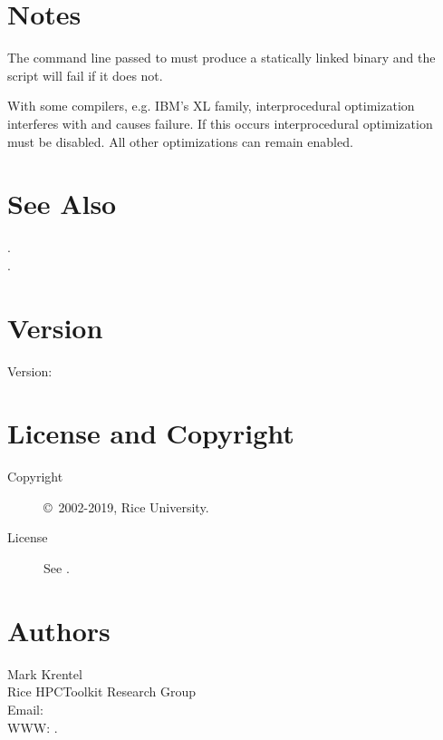 \documentclass[english]{article}
\begin{document}
\section{Notes}

The command line passed to  must produce a statically linked binary and the  script will fail if it does not.

With some compilers, e.g. IBM's XL family,
interprocedural optimization interferes with  and causes failure.
If this occurs interprocedural optimization must be disabled.
All other optimizations can remain enabled.


\section{See Also}

.\\
.

\section{Version}

Version: \Version

\section{License and Copyright}

\begin{description}
\item[Copyright] \copyright\ 2002-2019, Rice University.
\item[License] See .
\end{description}

\section{Authors}

\noindent
Mark Krentel \\
Rice HPCToolkit Research Group \\
Email:  \\
WWW: .

\LatexManEnd
\end{document}
